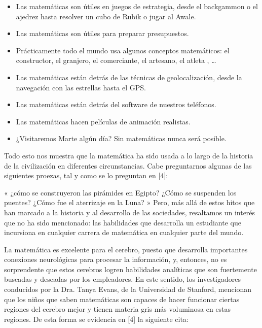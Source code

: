 \begin{itemize}
     \color{blue} \item \color{black} Las matemáticas son útiles en juegos de estrategia, desde el backgammon o el ajedrez hasta resolver un cubo de Rubik o jugar al Awale.   


    \color{blue} \item \color{black} Las matemáticas son útiles para preparar presupuestos.
     
      
    \color{blue} \item \color{black} Prácticamente todo el mundo usa algunos conceptos matemáticos: el constructor, el granjero, el comerciante, el artesano, el atleta , …
    
    \color{blue} \item \color{black} Las matemáticas están detrás de las técnicas de geolocalización, desde la navegación con  las estrellas hasta el GPS.   
    
    \color{blue} \item \color{black} Las matemáticas están detrás del software de nuestros teléfonos.   
     
      
    \color{blue} \item \color{black} Las matemáticas hacen películas de animación realistas. 
    
    \color{blue} \item \color{black} ¿Visitaremos Marte algún día? Sin matemáticas nunca será posible.
    \end{itemize}

Todo esto nos muestra que la matemática ha sido usada a lo largo de la historia de la civilización en diferentes circunstancias. Cabe preguntarnos algunas de las siguientes proezas, tal y como se lo preguntan en [4]: 

    « ¿cómo se construyeron las pirámides en Egipto? ¿Cómo se suspenden los puentes? ¿Cómo fue el aterrizaje en la Luna? » Pero, más allá de estos hitos que han marcado a la historia y al desarrollo de las sociedades, resaltamos un interés que no ha sido mencionado: las habilidades que desarrolla un estudiante que incursiona en cualquier carrera de matemática en cualquier parte del mundo.  

La matemática es excelente para el cerebro, puesto que desarrolla importantes conexiones neurológicas para procesar la información, y, entonces, no es sorprendente que estos cerebros logren habilidades analíticas que son fuertemente buscadas y deseadas por los empleadores. En este sentido, los investigadores conducidos por la Dra. Tanya Evans, de la Universidad de Stanford, mencionan que los niños que saben matemáticas son capaces de hacer funcionar ciertas regiones del cerebro mejor y tienen materia gris más voluminosa en estas regiones.  De esta forma se evidencia
en [4] la siguiente cita:

